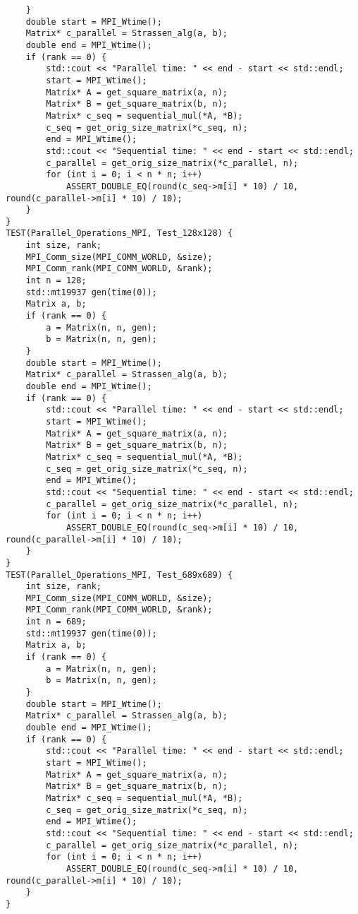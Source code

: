 \documentclass{report}
\begin{document}
\begin{lstlisting}
    }
    double start = MPI_Wtime();
    Matrix* c_parallel = Strassen_alg(a, b);
    double end = MPI_Wtime();
    if (rank == 0) {
        std::cout << "Parallel time: " << end - start << std::endl;
        start = MPI_Wtime();
        Matrix* A = get_square_matrix(a, n);
        Matrix* B = get_square_matrix(b, n);
        Matrix* c_seq = sequential_mul(*A, *B);
        c_seq = get_orig_size_matrix(*c_seq, n);
        end = MPI_Wtime();
        std::cout << "Sequential time: " << end - start << std::endl;
        c_parallel = get_orig_size_matrix(*c_parallel, n);
        for (int i = 0; i < n * n; i++)
            ASSERT_DOUBLE_EQ(round(c_seq->m[i] * 10) / 10, round(c_parallel->m[i] * 10) / 10);
    }
}
TEST(Parallel_Operations_MPI, Test_128x128) {
    int size, rank;
    MPI_Comm_size(MPI_COMM_WORLD, &size);
    MPI_Comm_rank(MPI_COMM_WORLD, &rank);
    int n = 128;
    std::mt19937 gen(time(0));
    Matrix a, b;
    if (rank == 0) {
        a = Matrix(n, n, gen);
        b = Matrix(n, n, gen);
    }
    double start = MPI_Wtime();
    Matrix* c_parallel = Strassen_alg(a, b);
    double end = MPI_Wtime();
    if (rank == 0) {
        std::cout << "Parallel time: " << end - start << std::endl;
        start = MPI_Wtime();
        Matrix* A = get_square_matrix(a, n);
        Matrix* B = get_square_matrix(b, n);
        Matrix* c_seq = sequential_mul(*A, *B);
        c_seq = get_orig_size_matrix(*c_seq, n);
        end = MPI_Wtime();
        std::cout << "Sequential time: " << end - start << std::endl;
        c_parallel = get_orig_size_matrix(*c_parallel, n);
        for (int i = 0; i < n * n; i++)
            ASSERT_DOUBLE_EQ(round(c_seq->m[i] * 10) / 10, round(c_parallel->m[i] * 10) / 10);
    }
}
TEST(Parallel_Operations_MPI, Test_689x689) {
    int size, rank;
    MPI_Comm_size(MPI_COMM_WORLD, &size);
    MPI_Comm_rank(MPI_COMM_WORLD, &rank);
    int n = 689;
    std::mt19937 gen(time(0));
    Matrix a, b;
    if (rank == 0) {
        a = Matrix(n, n, gen);
        b = Matrix(n, n, gen);
    }
    double start = MPI_Wtime();
    Matrix* c_parallel = Strassen_alg(a, b);
    double end = MPI_Wtime();
    if (rank == 0) {
        std::cout << "Parallel time: " << end - start << std::endl;
        start = MPI_Wtime();
        Matrix* A = get_square_matrix(a, n);
        Matrix* B = get_square_matrix(b, n);
        Matrix* c_seq = sequential_mul(*A, *B);
        c_seq = get_orig_size_matrix(*c_seq, n);
        end = MPI_Wtime();
        std::cout << "Sequential time: " << end - start << std::endl;
        c_parallel = get_orig_size_matrix(*c_parallel, n);
        for (int i = 0; i < n * n; i++)
            ASSERT_DOUBLE_EQ(round(c_seq->m[i] * 10) / 10, round(c_parallel->m[i] * 10) / 10);
    }
}


\end{lstlisting}
\end{document}
